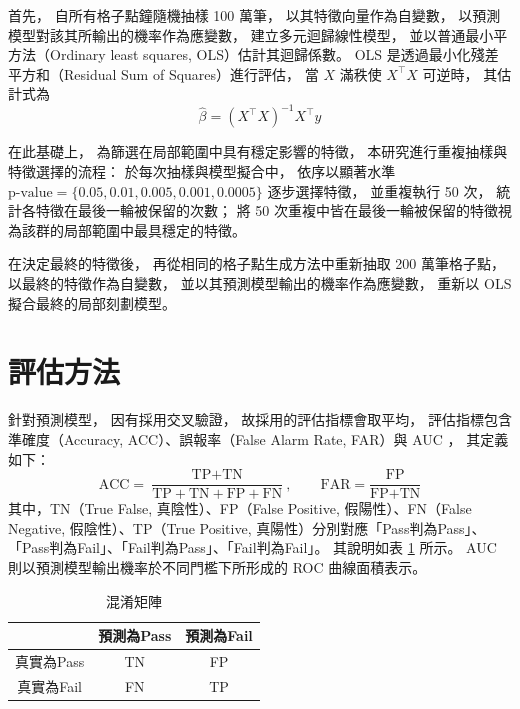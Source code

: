 \documentclass[12pt,a4paper,oneside]{book}
\begin{document}
\begin{enumerate}
	首先，
	自所有格子點鐘隨機抽樣 100 萬筆，
	以其特徵向量作為自變數，
	以預測模型對該其所輸出的機率作為應變數，
	建立多元迴歸線性模型，
	並以普通最小平方法（Ordinary least squares, OLS）估計其迴歸係數。
	OLS 是透過最小化殘差平方和（Residual Sum of Squares）進行評估，
	當 $X$ 滿秩使 $X^\top X$ 可逆時，
	其估計式為 $$\hat{\beta}=(X^\top X)^{-1}X^\top y$$

	在此基礎上，
	為篩選在局部範圍中具有穩定影響的特徵，
	本研究進行重複抽樣與特徵選擇的流程：
	於每次抽樣與模型擬合中，
	依序以顯著水準 $\text{p-value} = \{ 0.05, 0.01, 0.005, 0.001, 0.0005\}$ 逐步選擇特徵，
	並重複執行 50 次，
	統計各特徵在最後一輪被保留的次數；
	將 50 次重複中皆在最後一輪被保留的特徵視為該群的局部範圍中最具穩定的特徵。

	在決定最終的特徵後，
	再從相同的格子點生成方法中重新抽取 200 萬筆格子點，
	以最終的特徵作為自變數，
	並以其預測模型輸出的機率作為應變數，
	重新以 OLS 擬合最終的局部刻劃模型。
	
	\end{enumerate}

	\section{評估方法}	

	針對預測模型，
	因有採用交叉驗證，
	故採用的評估指標會取平均，
	評估指標包含準確度（Accuracy, ACC）、誤報率（False Alarm Rate, FAR）與 AUC ，
	其定義如下：
	$$
	\mathrm{ACC}=\frac{\text{TP}+\text{TN}}{\text{TP}+\text{TN}+\text{FP}+\text{FN}},
	\qquad
	\mathrm{FAR}=\frac{\text{FP}}{\text{FP}+\text{TN}}
	$$
	其中，TN（True False, 真陰性）、FP（False Positive, 假陽性）、FN（False Negative, 假陰性）、TP（True Positive, 真陽性）分別對應「Pass判為Pass」、「Pass判為Fail」、「Fail判為Pass」、「Fail判為Fail」。
	其說明如表 \ref{tab:confusion_matrix} 所示。
	AUC 則以預測模型輸出機率於不同門檻下所形成的 ROC 曲線面積表示。

	\begin{table}[H]
		\centering
		\caption{混淆矩陣}
		\vspace{0.15cm}
		\label{tab:confusion_matrix}
		\begin{tabular}{|c|c|c|}
		\hline
		& 預測為Pass & 預測為Fail \\
		\hline
		真實為Pass & TN & FP \\
		\hline
		真實為Fail & FN & TP \\
		\hline
		\end{tabular}
	\end{table}
	
\end{document}
